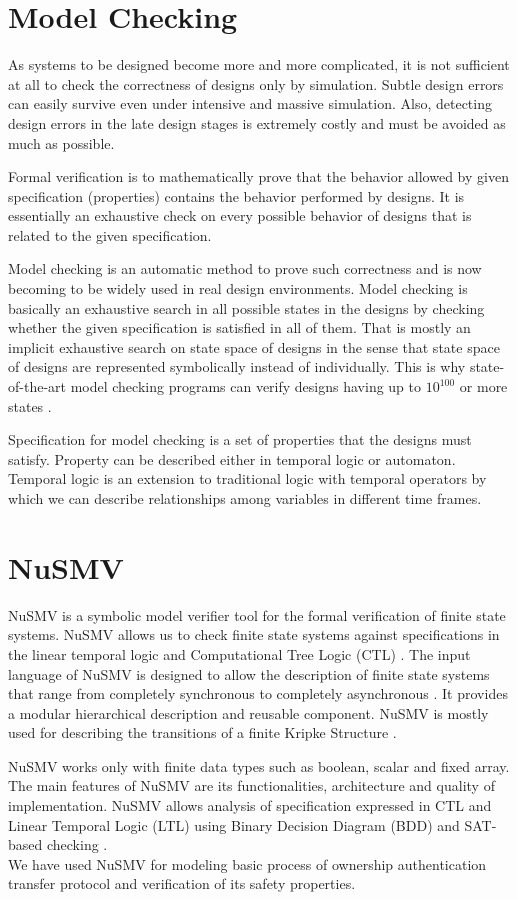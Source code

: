\documentclass[letterpaper]{article}
\begin{document}
\section{Model Checking}
\label{c}
As systems to be designed become more and more complicated, it is not sufficient at all to check the correctness of designs only by simulation. Subtle design errors can easily survive even under intensive and massive simulation. Also, detecting design errors in the late design stages is extremely costly and must be avoided as much as possible.
\par Formal verification is to mathematically prove that the behavior allowed by given specification (properties) contains
the behavior performed by designs. It is essentially an exhaustive check on every possible behavior of designs that is related to the given specification.
\par Model checking is an automatic method to prove such correctness and is now becoming to be widely used in real design environments. Model checking is basically an exhaustive search in all possible states in the designs by checking whether the given specification is satisfied in all of them. That is mostly an implicit exhaustive search on state space of designs in the sense that state space of designs are represented symbolically instead of individually. This is why state-of-the-art model checking programs can verify designs having up to $10^{100}$ or more states \cite{5}.
\par Specification for model checking is a set of properties that the designs must satisfy. Property can be described either in temporal logic or automaton. Temporal logic is an extension to traditional logic with temporal operators by which we can describe relationships among variables in different time frames. 

\section{NuSMV}
\label{d}
NuSMV is a symbolic model verifier tool for the formal verification of finite state systems. NuSMV allows us to check finite state systems against specifications in the linear temporal logic and Computational Tree Logic (CTL) \cite{6}. The input language of NuSMV is designed to allow the description of finite state systems that range from completely synchronous to completely asynchronous \cite{7}. It provides a modular hierarchical description and reusable component. NuSMV is mostly used for describing the transitions of a finite Kripke Structure \cite{kp}.
\par	NuSMV works only with finite data types such as boolean, scalar and fixed array. The main features of NuSMV are its functionalities, architecture and quality of implementation. NuSMV allows analysis of specification expressed in CTL and Linear Temporal Logic (LTL) using Binary Decision Diagram (BDD) and SAT-based checking \cite{6}.\\
	 We have used NuSMV for modeling basic process of ownership authentication transfer protocol and verification of its safety properties.
\end{document}
